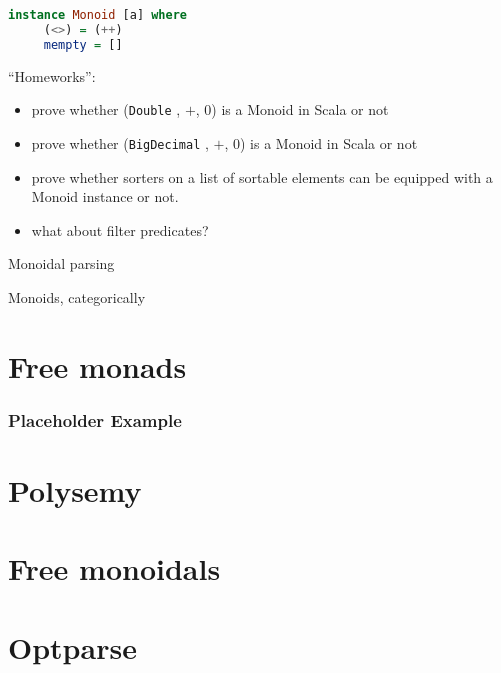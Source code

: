 \documentclass[10pt]{beamer}
\begin{document}
\begin{frame}[fragile]
  \begin{lstlisting}[language=haskell]
  instance Monoid [a] where
     (<>) = (++)
     mempty = []
  \end{lstlisting}
\end{frame}
\begin{frame}[fragile]
  ``Homeworks'':
  \begin{itemize}
    \item prove whether (\verb|Double| , $+$, $0$) is a Monoid in Scala or not
    \item prove whether (\verb|BigDecimal| , $+$, $0$) is a Monoid in Scala or not
    \item prove whether sorters on a list of sortable elements can be equipped with a Monoid instance or not. 
    \item what about filter predicates?
  \end{itemize}
\end{frame}


\begin{frame}[fragile]
  Monoidal parsing




\end{frame}  

\begin{frame}
  Monoids, categorically




\end{frame}


\section{Free monads}
\begin{frame}[fragile]
  \frametitle{Placeholder Example}
\end{frame}




\section{Polysemy}


\section{Free monoidals}


\section{Optparse}


% 
% 
\end{document}
